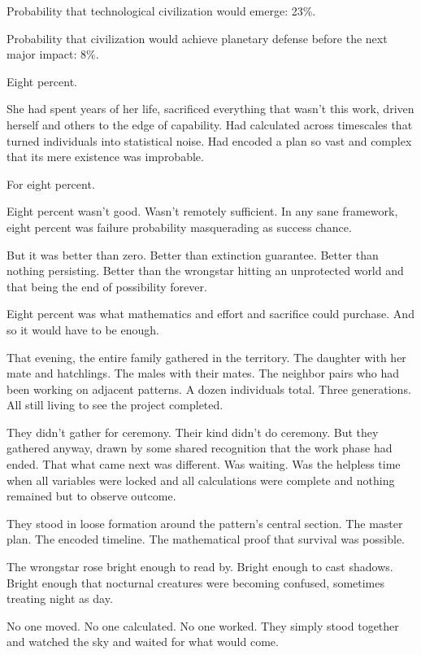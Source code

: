 Probability that technological civilization would emerge: 23\%.

Probability that civilization would achieve planetary defense before the next major impact: 8\%.

Eight percent.

She had spent years of her life, sacrificed everything that wasn't this work, driven herself and others to the edge of capability. Had calculated across timescales that turned individuals into statistical noise. Had encoded a plan so vast and complex that its mere existence was improbable.

For eight percent.

Eight percent wasn't good. Wasn't remotely sufficient. In any sane framework, eight percent was failure probability masquerading as success chance.

But it was better than zero. Better than extinction guarantee. Better than nothing persisting. Better than the wrongstar hitting an unprotected world and that being the end of possibility forever.

Eight percent was what mathematics and effort and sacrifice could purchase. And so it would have to be enough.

\scenebreak

That evening, the entire family gathered in the territory. The daughter with her mate and hatchlings. The males with their mates. The neighbor pairs who had been working on adjacent patterns. A dozen individuals total. Three generations. All still living to see the project completed.

They didn't gather for ceremony. Their kind didn't do ceremony. But they gathered anyway, drawn by some shared recognition that the work phase had ended. That what came next was different. Was waiting. Was the helpless time when all variables were locked and all calculations were complete and nothing remained but to observe outcome.

They stood in loose formation around the pattern's central section. The master plan. The encoded timeline. The mathematical proof that survival was possible.

The wrongstar rose bright enough to read by. Bright enough to cast shadows. Bright enough that nocturnal creatures were becoming confused, sometimes treating night as day.

No one moved. No one calculated. No one worked. They simply stood together and watched the sky and waited for what would come.

